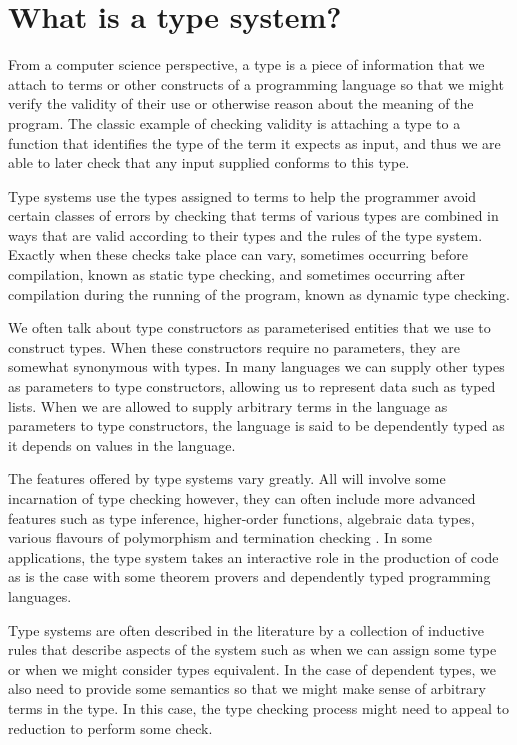 \chapter{What is a type system?}

From a computer science perspective, a type is a piece of information
that we attach to terms or other constructs of a programming language
so that we might verify the validity of their use or otherwise reason
about the meaning of the program. The classic example of checking
validity is attaching a type to a function that identifies
the type of the term it expects as input, and thus we are able to later
check that any input supplied conforms to this type.

Type systems use the types assigned to terms to help the
programmer avoid certain classes of errors by checking that terms of
various types are combined in ways that are valid according to
their types and the rules of the type system. Exactly when these
checks take place can vary, sometimes occurring before compilation,
known as static type checking, and sometimes occurring after
compilation during the running of the program, known as dynamic type
checking.

We often talk about type constructors as parameterised entities that
we use to construct types. When these constructors require no
parameters, they are somewhat synonymous with types. In many languages
we can supply other types as parameters to type
constructors, allowing us to represent data such as typed lists. When
we are allowed to supply arbitrary terms in the language as
parameters to type constructors, the language is said to be
dependently typed as it depends on values in the language.

The features offered by type systems vary greatly. All will involve
some incarnation of type checking however, they can often include
more advanced features such as type inference, higher-order functions,
algebraic data types, various flavours of polymorphism and termination
checking \cite{Abel_2004}. In some applications, the type system
takes an interactive role in the production of code as is the case
with some theorem provers and dependently typed programming languages. 

Type systems are often described in the literature by a collection of
inductive rules that describe aspects of the system such as when we
can assign some type or when we might consider types
equivalent. In the case of dependent types, we also need to provide
some semantics so that we might make sense of arbitrary terms in the
type. In this case, the type checking process might need to appeal to
reduction to perform some check.
